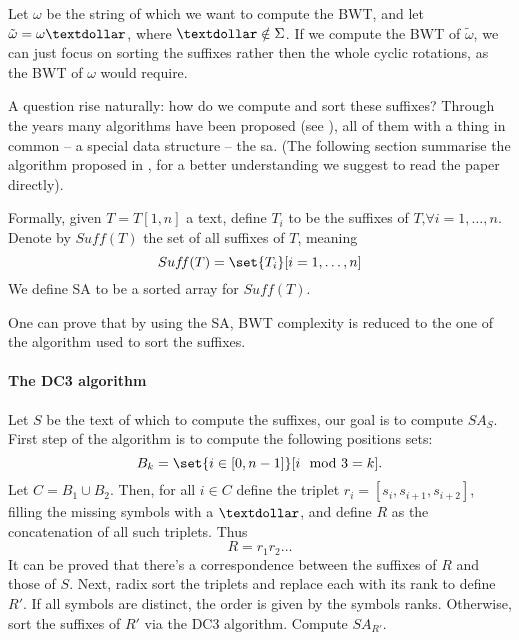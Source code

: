 \documentclass{subfiles}
\begin{document}
    Let \(\omega\) be the string of which we want to compute the BWT, 
        and let \(\tilde{\omega} = \omega\textdollar\), 
        where \(\textdollar \notin \Sigma\).
        If we compute the BWT of \(\tilde{\omega}\),
        we can just focus on sorting the suffixes rather then the whole cyclic rotations,
        as the BWT of \(\omega\) would require.

    A question rise naturally: how do we compute and sort these suffixes?
        Through the years many algorithms have been proposed 
        (see \cite{karkkainen2006, ko2005, baier2016}), 
        all of them with a thing in common -- a special data structure -- the \gls{sa}.
        (The following section summarise the algorithm proposed in \cite{karkkainen2006},
        for a better understanding we suggest to read the paper directly). 

    Formally, given \(T = T[1, n]\) a text,
        define \(T_{i}\) to be the suffixes of \(T \text{,} \forall i = 1, \ldots, n\).
        Denote by \(Suf\!f(T)\) the set of all suffixes of \(T\),
            meaning 
            \[
                Suf\!f (T) = \set{T_{i}}[i = 1, \ldots, n] 
            \]
        We define SA to be a sorted array for \(Suf\!f(T)\).

    \begin{remark*}
        One can prove that by using the SA, 
            BWT complexity is reduced to the one of the algorithm used to sort the suffixes.
    \end{remark*}

    \paragraph{The DC3 algorithm}
    Let \(S\) be the text of which to compute the suffixes, our goal is to compute \(SA_{S}\).
    First step of the algorithm is to compute the following positions sets:
    \[
        B_{k} = \set{i \in [0, n - 1]}[i \mod 3 = k].
    \]
    Let \(C = B_{1} \cup B_{2}\). Then, 
        for all \(i \in C\) define the triplet \(r_i = [s_{i}, s_{i + 1}, s_{i + 2}]\),
        filling the missing symbols with a \(\textdollar\), 
        and define \(R\) as the concatenation of all such triplets.
        Thus 
        \[
            R = r_{1}r_{2}\ldots
        \]
        It can be proved that there's a correspondence between the suffixes of \(R\) 
            and those of \(S\).
    Next, radix sort the triplets and replace each with its rank to define \(R'\).
    If all symbols are distinct, the order is given by the symbols ranks.
    Otherwise, sort the suffixes of \(R'\) via the DC3 algorithm.
    Compute \(SA_{R'}\).
\end{document}
